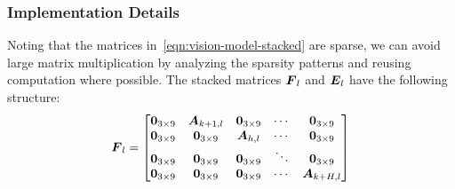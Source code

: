 \subsubsection{Implementation Details}
Noting that the matrices in~\eqref{eqn:vision-model-stacked} are sparse, we can avoid large matrix multiplication by analyzing the sparsity patterns and reusing computation where possible.
The stacked matrices $\boldsymbol F_l$ and $\boldsymbol E_l$ have the following structure:
\begin{equation}
\boldsymbol F_l =
\begin{bmatrix}
\boldsymbol 0_{3\times9} & \boldsymbol A_{k+1,l} & \boldsymbol 0_{3\times9} & \cdots & \boldsymbol 0_{3\times9} \\
\boldsymbol 0_{3\times9} & \boldsymbol 0_{3\times9} & \boldsymbol A_{h,l} & \cdots & \boldsymbol 0_{3\times9} \\
\boldsymbol 0_{3\times9} & \boldsymbol 0_{3\times9} & \boldsymbol 0_{3\times9} & \ddots & \boldsymbol 0_{3\times9} \\
\boldsymbol 0_{3\times9} & \boldsymbol 0_{3\times9} & \boldsymbol 0_{3\times9} & \cdots & \boldsymbol A_{k+H,l} \\
\end{bmatrix}
\end{equation}



